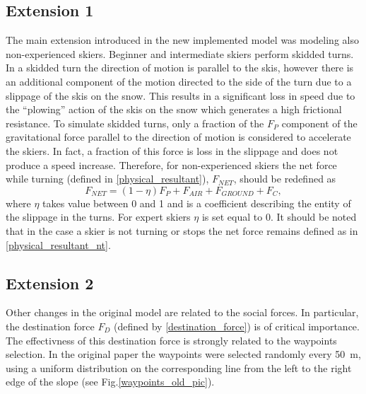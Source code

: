 \documentclass[12pt,a4paper,twoside]{book}
\begin{document}
\subsection{Extension 1}
The main extension introduced in the new implemented model was modeling also non-experienced skiers. Beginner and intermediate skiers perform skidded turns. In a skidded turn the direction of motion is parallel to the skis, however there is an additional component of the motion directed to the side of the turn due to a slippage of the skis on the snow. This results in a significant loss in speed due to the ``plowing'' action of the skis on the snow which generates a high frictional resistance. To simulate skidded turns, only a fraction of the $F_P$ component of the gravitational force parallel to the direction of motion is considered to accelerate the skiers. In fact, a fraction of this force is loss in the slippage and does not produce a speed increase. Therefore, for non-experienced skiers the net force while turning (defined in \ref{physical_resultant}), $F_{NET}$, should be redefined as
\begin{equation}
F_{NET}=(1-\eta) F_P + F_{AIR} + F_{GROUND} + F_C,
\end{equation}
where $\eta$ takes value between 0 and 1 and is a coefficient describing the entity of the slippage in the turns. For expert skiers $\eta$ is set equal to 0. It should be noted that in the case a skier is not turning or stops the net force remains defined as in \ref{physical_resultant_nt}.

\subsection{Extension 2}
Other changes in the original model are related to the social forces. In particular, the destination force $F_D$ (defined by \ref{destination_force}) is of critical importance. The effectivness of this destination force is strongly related to the waypoints selection. In the original paper the waypoints were selected randomly every 50~m, using a uniform distribution on the corresponding line from the left to the right edge of the slope (see Fig.\ref{waypoints_old_pic}).
\end{document}
